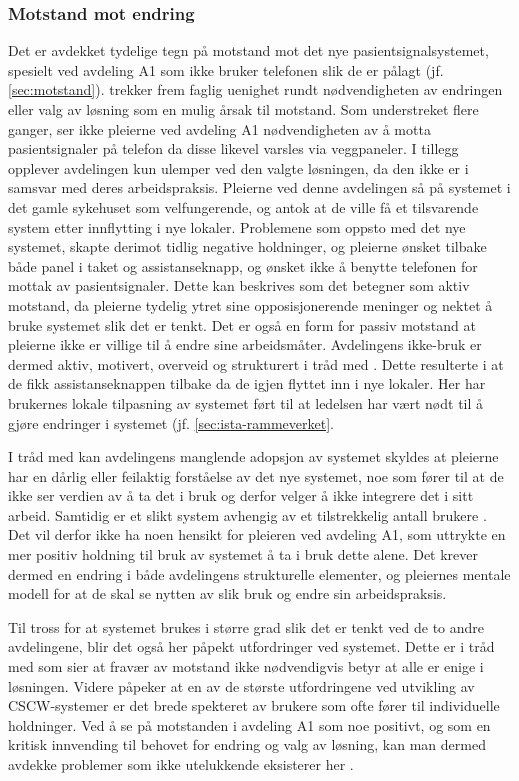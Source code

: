 \subsubsection{Motstand mot endring}
Det er avdekket tydelige tegn på motstand mot det nye pasientsignalsystemet, spesielt ved avdeling A1 som ikke bruker telefonen slik de er pålagt (jf. \ref{sec:motstand}). \citet{Jacobsen12} trekker frem faglig uenighet rundt nødvendigheten av endringen eller valg av løsning som en mulig årsak til motstand. Som understreket flere ganger, ser ikke pleierne ved avdeling A1 nødvendigheten av å motta pasientsignaler på telefon da disse likevel varsles via veggpaneler. I tillegg opplever avdelingen kun ulemper ved den valgte løsningen, da den ikke er i samsvar med deres arbeidspraksis. Pleierne ved denne avdelingen så på systemet i det gamle sykehuset som velfungerende, og antok at de ville få et tilsvarende system etter innflytting i nye lokaler. Problemene som oppsto med det nye systemet, skapte derimot tidlig negative holdninger, og pleierne ønsket tilbake både panel i taket og assistanseknapp, og ønsket ikke å benytte telefonen for mottak av pasientsignaler. Dette kan beskrives som det \citet{Lapointe05} betegner som aktiv motstand, da pleierne tydelig ytret sine opposisjonerende meninger og nektet å bruke systemet slik det er tenkt. Det er også en form for passiv motstand at pleierne ikke er villige til å endre sine arbeidsmåter. Avdelingens ikke-bruk er dermed aktiv, motivert, overveid og strukturert i tråd med \citet{Satchell09}. Dette resulterte i at de fikk assistanseknappen tilbake da de igjen flyttet inn i nye lokaler. Her har brukernes lokale tilpasning av systemet ført til at ledelsen har vært nødt til å gjøre endringer i systemet (jf. \ref{sec:ista-rammeverket}. 

\noindent
I tråd med \citet{Orlikowski92} kan avdelingens manglende adopsjon av systemet skyldes at pleierne har en dårlig eller feilaktig forståelse av det nye systemet, noe som fører til at de ikke ser verdien av å ta det i bruk og derfor velger å ikke integrere det i sitt arbeid. Samtidig er et slikt system avhengig av et tilstrekkelig antall brukere \citep{Ackermann00}. Det vil derfor ikke ha noen hensikt for pleieren ved avdeling A1, som uttrykte en mer positiv holdning til bruk av systemet å ta i bruk dette alene. Det krever dermed en endring i både avdelingens strukturelle elementer, og pleiernes mentale modell for at de skal se nytten av slik bruk og endre sin arbeidspraksis.

\noindent
Til tross for at systemet brukes i større grad slik det er tenkt ved de to andre avdelingene, blir det også her påpekt utfordringer ved systemet. Dette er i tråd med \citet{Jacobsen12} som sier at fravær av motstand ikke nødvendigvis betyr at alle er enige i løsningen. Videre påpeker \citet{Berg99} at en av de største utfordringene ved utvikling av CSCW-systemer er det brede spekteret av brukere som ofte fører til individuelle holdninger. Ved å se på motstanden i avdeling A1 som noe positivt, og som en kritisk innvending til behovet for endring og valg av løsning, kan man dermed avdekke problemer som ikke utelukkende eksisterer her \citep{Jacobsen}. 

